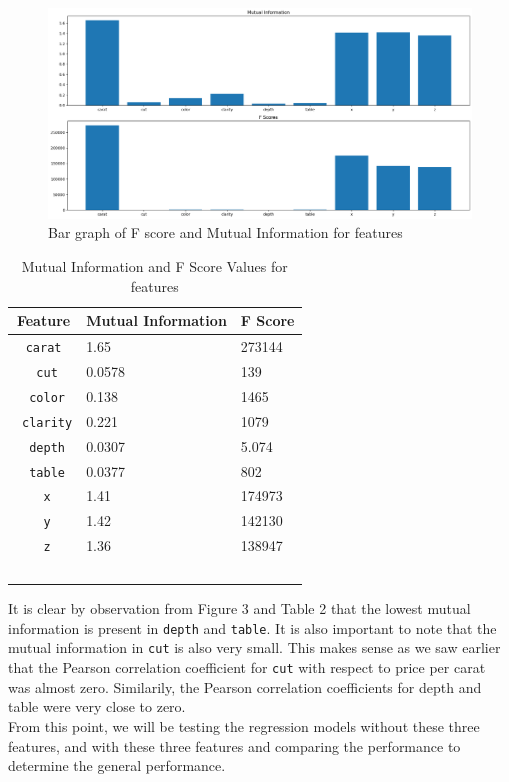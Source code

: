 \documentclass[11pt,letterpaper]{article}
\begin{document}
\begin{figure}[H]
    \centering
   \includegraphics[width=0.8\linewidth]{../Figures/Question2/mi.png}
   \caption{Bar graph of F score and Mutual Information for features}
\end{figure}
\begin{table}[!ht]
    \centering
    \begin{tabular}{c l l}
    \hline
        Feature & Mutual Information & F Score \\ \hline
        \texttt{carat} & 1.65 & 273144 \\ \
        \texttt{cut} & 0.0578 & 139 \\ \
        \texttt{color} & 0.138 & 1465 \\ \
        \texttt{clarity} & 0.221 & 1079 \\ \
        \texttt{depth} & 0.0307 & 5.074 \\ \
        \texttt{table} & 0.0377 & 802 \\ \
        \texttt{x} & 1.41 & 174973 \\ \
       \texttt{y} & 1.42 & 142130 \\ \
        \texttt{z} & 1.36 & 138947 \\ \
    \end{tabular}
    \caption{Mutual Information and F Score Values for features}
\end{table}

It is clear by observation from Figure 3 and Table 2 that the lowest mutual 
information is present in \texttt{depth} and \texttt{table}. It is also 
important to note that the mutual information in \texttt{cut} is also very small. 
This makes sense as we saw earlier that the Pearson correlation coefficient for 
\texttt{cut} with respect to price per carat was almost zero. Similarily, the 
Pearson correlation coefficients for depth and table were very close to zero. \\

From this point, we will be testing the regression models without these three 
features, and with these three features and comparing the performance to 
determine the general performance.
\end{document}
